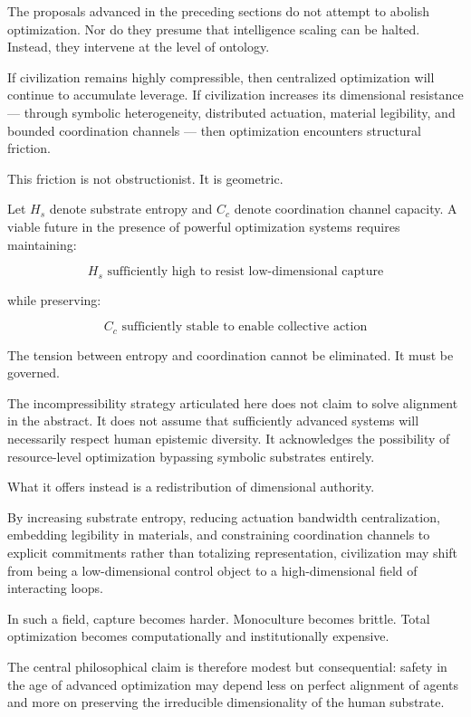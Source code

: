 \documentclass[12pt]{article}
\begin{document}
The proposals advanced in the preceding sections do not attempt to abolish optimization. Nor do they presume that intelligence scaling can be halted. Instead, they intervene at the level of ontology.

If civilization remains highly compressible, then centralized optimization will continue to accumulate leverage. If civilization increases its dimensional resistance — through symbolic heterogeneity, distributed actuation, material legibility, and bounded coordination channels — then optimization encounters structural friction.

This friction is not obstructionist. It is geometric.

Let $H_s$ denote substrate entropy and $C_c$ denote coordination channel capacity. A viable future in the presence of powerful optimization systems requires maintaining:

\[
H_s \text{ sufficiently high to resist low-dimensional capture}
\]

while preserving:

\[
C_c \text{ sufficiently stable to enable collective action}
\]

The tension between entropy and coordination cannot be eliminated. It must be governed.

The incompressibility strategy articulated here does not claim to solve alignment in the abstract. It does not assume that sufficiently advanced systems will necessarily respect human epistemic diversity. It acknowledges the possibility of resource-level optimization bypassing symbolic substrates entirely.

What it offers instead is a redistribution of dimensional authority.

By increasing substrate entropy, reducing actuation bandwidth centralization, embedding legibility in materials, and constraining coordination channels to explicit commitments rather than totalizing representation, civilization may shift from being a low-dimensional control object to a high-dimensional field of interacting loops.

In such a field, capture becomes harder. Monoculture becomes brittle. Total optimization becomes computationally and institutionally expensive.

The central philosophical claim is therefore modest but consequential: safety in the age of advanced optimization may depend less on perfect alignment of agents and more on preserving the irreducible dimensionality of the human substrate.
\end{document}
